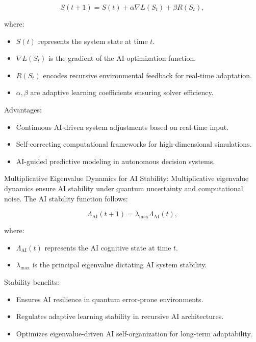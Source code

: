 \begin{equation}
S(t+1) = S(t) + \alpha \nabla L(S_t) + \beta R(S_t),
\end{equation}

where:
\begin{itemize}
    \item $S(t)$ represents the system state at time $t$.
    \item $\nabla L(S_t)$ is the gradient of the AI optimization function.
    \item $R(S_t)$ encodes recursive environmental feedback for real-time adaptation.
    \item $\alpha, \beta$ are adaptive learning coefficients ensuring solver efficiency.
\end{itemize}

Advantages:
\begin{itemize}
    \item Continuous AI-driven system adjustments based on real-time input.
    \item Self-correcting computational frameworks for high-dimensional simulations.
    \item AI-guided predictive modeling in autonomous decision systems.
\end{itemize}

\pa Multiplicative Eigenvalue Dynamics for AI Stability: Multiplicative eigenvalue dynamics ensure AI stability under quantum uncertainty and computational noise. The AI stability function follows:

\begin{equation}
\Lambda_{\text{AI}}(t+1) = \lambda_{\text{max}} \Lambda_{\text{AI}}(t),
\end{equation}

where:
\begin{itemize}
    \item $\Lambda_{\text{AI}}(t)$ represents the AI cognitive state at time $t$.
    \item $\lambda_{\text{max}}$ is the principal eigenvalue dictating AI system stability.
\end{itemize}

Stability benefits:
\begin{itemize}
    \item Ensures AI resilience in quantum error-prone environments.
    \item Regulates adaptive learning stability in recursive AI architectures.
    \item Optimizes eigenvalue-driven AI self-organization for long-term adaptability.
\end{itemize}

